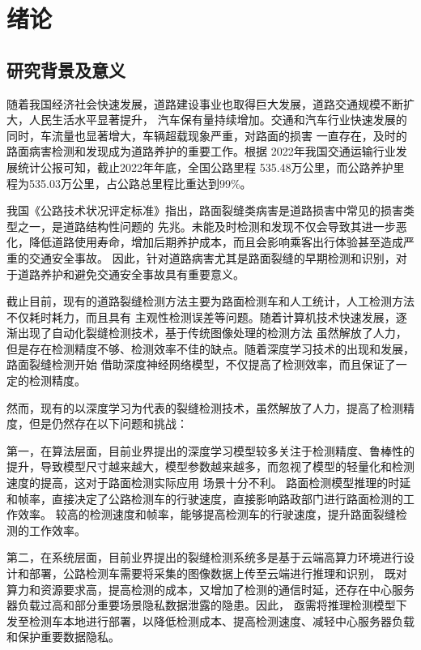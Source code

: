 \chapter{绪\hspace{6pt}论}

\section{研究背景及意义}
随着我国经济社会快速发展，道路建设事业也取得巨大发展，道路交通规模不断扩大，人民生活水平显著提升，
汽车保有量持续增加。交通和汽车行业快速发展的同时，车流量也显著增大，车辆超载现象严重，对路面的损害
一直存在，及时的路面病害检测和发现成为道路养护的重要工作。根据
2022年我国交通运输行业发展统计公报可知，截止2022年年底，全国公路里程
535.48万公里，而公路养护里程为535.03万公里，占公路总里程比重达到99\%。

我国《公路技术状况评定标准》指出，路面裂缝类病害是道路损害中常见的损害类型之一，是道路结构性问题的
先兆。未能及时检测和发现不仅会导致其进一步恶化，降低道路使用寿命，增加后期养护成本，而且会影响乘客出行体验甚至造成严重的交通安全事故。
因此，针对道路病害尤其是路面裂缝的早期检测和识别，对于道路养护和避免交通安全事故具有重要意义。

截止目前，现有的道路裂缝检测方法主要为路面检测车和人工统计，人工检测方法不仅耗时耗力，而且具有
主观性检测误差等问题。随着计算机技术快速发展，逐渐出现了自动化裂缝检测技术，基于传统图像处理的检测方法
虽然解放了人力，但是存在检测精度不够、检测效率不佳的缺点。随着深度学习技术的出现和发展，路面裂缝检测开始
借助深度神经网络模型，不仅提高了检测效率，而且保证了一定的检测精度。

然而，现有的以深度学习为代表的裂缝检测技术，虽然解放了人力，提高了检测精度，但是仍然存在以下问题和挑战：

第一，在算法层面，目前业界提出的深度学习模型较多关注于检测精度、鲁棒性的提升，导致模型尺寸越来越大，模型参数越来越多，而忽视了模型的轻量化和检测速度的提高，这对于路面检测实际应用
场景十分不利。
路面检测模型推理的时延和帧率，直接决定了公路检测车的行驶速度，直接影响路政部门进行路面检测的工作效率。
较高的检测速度和帧率，能够提高检测车的行驶速度，提升路面裂缝检测的工作效率。

第二，在系统层面，目前业界提出的裂缝检测系统多是基于云端高算力环境进行设计和部署，公路检测车需要将采集的图像数据上传至云端进行推理和识别，
既对算力和资源要求高，提高检测的成本，又增加了检测的通信时延，还存在中心服务器负载过高和部分重要场景隐私数据泄露的隐患。因此，
亟需将推理检测模型下发至检测车本地进行部署，以降低检测成本、提高检测速度、减轻中心服务器负载和保护重要数据隐私。

